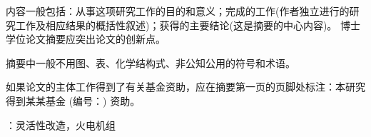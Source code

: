 
\setcounter{page}{1}

内容一般包括：从事这项研究工作的目的和意义；完成的工作(作者独立进行的研究工作及相应结果的概括性叙述)；获得的主要结论(这是摘要的中心内容)。
博士学位论文摘要应突出论文的创新点。

摘要中一般不用图、表、化学结构式、非公知公用的符号和术语。 

如果论文的主体工作得到了有关基金资助，应在摘要第一页的页脚处标注：本研究得到某某基金 (编号：) 资助。


\vspace{\baselineskip}
：灵活性改造，火电机组

\clearpage
